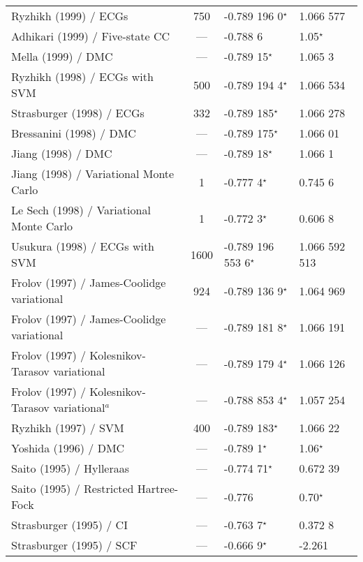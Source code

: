 \documentclass[Dissertation.tex]{subfiles}
\begin{document}
{\begin{center}
\begin{longtable}{l c l l}
	Ryzhikh (1999) \cite{Ryzhikh1999} / ECGs & 750 & -0.789 196 0$^\star$ & 1.066 577 \\
	Adhikari (1999) \cite{Adhikari1999} / Five-state CC & --- & -0.788 6 & 1.05$^\star$ \\
	Mella (1999) \cite{Mella1999} / DMC & --- & -0.789 15$^\star$ & 1.065 3 \\
	Ryzhikh (1998) \cite{Ryzhikh1998} / ECGs with SVM & 500 & -0.789 194 4$^\star$ & 1.066 534 \\
	Strasburger (1998) \cite{Strasburger1998} / ECGs & 332 & -0.789 185$^\star$ & 1.066 278 \\
	Bressanini (1998) \cite{Bressanini1998} / DMC & --- & -0.789 175$^\star$ & 1.066 01 \\
	Jiang (1998) \cite{Jiang1998} / DMC & --- & -0.789 18$^\star$ & 1.066 1 \\
	Jiang (1998) \cite{Jiang1998} / Variational Monte Carlo & 1 & -0.777 4$^\star$ & 0.745 6 \\
	Le Sech (1998) \cite{LeSech1998} / Variational Monte Carlo & 1 & -0.772 3$^\star$ & 0.606 8 \\
	Usukura (1998) \cite{Usukura1998} / ECGs with SVM & 1600 & -0.789 196 553 6$^\star$ & 1.066 592 513 \\
	Frolov (1997) \cite{Frolov1997a} / James-Coolidge variational & 924 & -0.789 136 9$^\star$ & 1.064 969 \\
	Frolov (1997) \cite{Frolov1997a} / James-Coolidge variational & --- & -0.789 181 8$^\star$ & 1.066 191 \\
	Frolov (1997) \cite{Frolov1997c} / Kolesnikov-Tarasov variational & --- & -0.789 179 4$^\star$ & 1.066 126 \\
	Frolov (1997) \cite{Frolov1997c} / Kolesnikov-Tarasov variational$^a$ & --- & -0.788 853 4$^\star$ & 1.057 254 \\
	Ryzhikh (1997) \cite{Ryzhikh1997} / SVM & 400 & -0.789 183$^\star$ & 1.066 22 \\
	Yoshida (1996) \cite{Yoshida1996} / DMC & --- & -0.789 1$^\star$ & 1.06$^\star$ \\
	Saito (1995) \cite{Saito1995a} / Hylleraas & --- & -0.774 71$^\star$ & 0.672 39 \\*
	Saito (1995) \cite{Saito1995} / Restricted Hartree-Fock & --- & -0.776 & 0.70$^\star$ \\*
	Strasburger (1995) \cite{Strasburger1995} / CI & --- & -0.763 7$^\star$ & 0.372 8 \\*
	Strasburger (1995) \cite{Strasburger1995} / SCF & --- & -0.666 9$^\star$ & -2.261 \\*

\end{longtable}
\end{center}}
\end{document}
